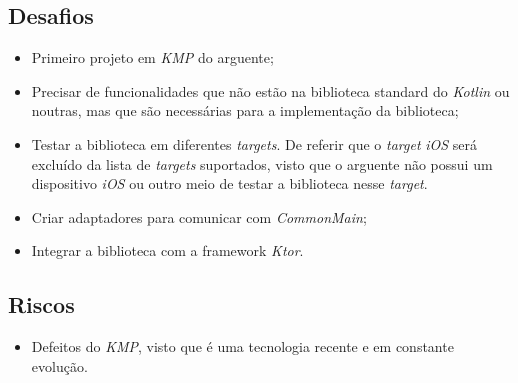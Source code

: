 \subsection{Desafios}\label{subsec:desafios}
\begin{itemize}[topsep=0pt,itemsep=0pt,partopsep=0pt, parsep=0pt]
    \item Primeiro projeto em \textit{KMP} do arguente;
    \item Precisar de funcionalidades que não estão na biblioteca standard do \textit{Kotlin} ou noutras, mas que são necessárias para a implementação da biblioteca;
    \item Testar a biblioteca em diferentes \textit{targets}.
    De referir que o \textit{target} \textit{iOS} será excluído da lista de \textit{targets} suportados, visto que o arguente não possui um dispositivo \textit{iOS} ou outro meio de
    testar a biblioteca nesse \textit{target}.
    \item Criar adaptadores para comunicar com \textit{CommonMain};
    \item Integrar a biblioteca com a framework \textit{Ktor}.
\end{itemize}

\subsection{Riscos}\label{subsec:riscos}
\begin{itemize}[topsep=0pt,itemsep=0pt,partopsep=0pt, parsep=0pt]
    \item Defeitos do \textit{KMP}, visto que é uma tecnologia recente e em constante evolução.
\end{itemize}
